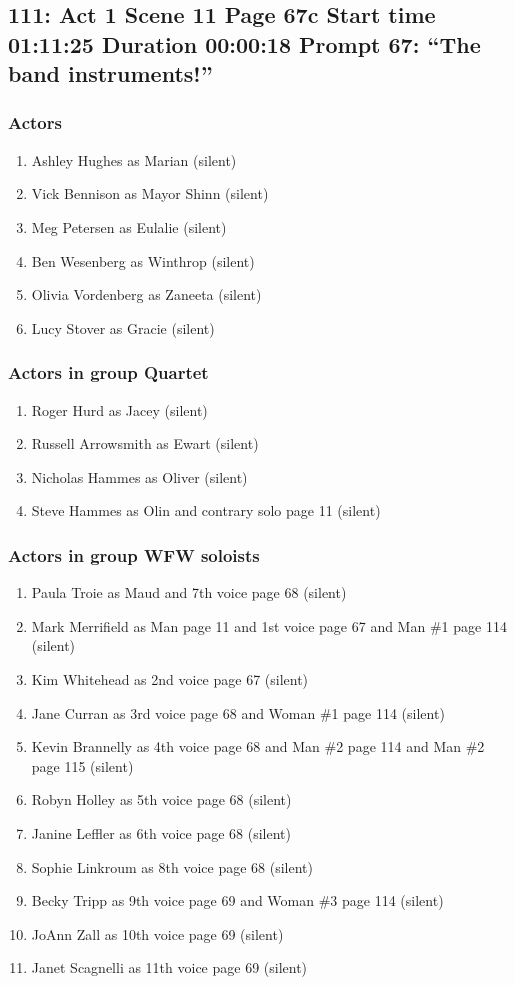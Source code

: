 \subsection{111: Act 1 Scene 11 Page 67c Start time 01:11:25 Duration 00:00:18 Prompt 67: ``The band instruments!''}

\subsubsection{Actors}
\begin{enumerate}
\item Ashley Hughes as Marian (silent)
\item Vick Bennison as Mayor Shinn (silent)
\item Meg Petersen as Eulalie (silent)
\item Ben Wesenberg as Winthrop (silent)
\item Olivia Vordenberg as Zaneeta (silent)
\item Lucy Stover as Gracie (silent)
\end{enumerate}
\subsubsection{Actors in group Quartet}
\begin{enumerate}
\item Roger Hurd as Jacey (silent)
\item Russell Arrowsmith as Ewart (silent)
\item Nicholas Hammes as Oliver (silent)
\item Steve Hammes as Olin and contrary solo page 11 (silent)
\end{enumerate}
\subsubsection{Actors in group WFW soloists}
\begin{enumerate}
\item Paula Troie as Maud and 7th voice page 68 (silent)
\item Mark Merrifield as Man page 11 and 1st voice page 67 and Man \#1 page 114 (silent)
\item Kim Whitehead as 2nd voice page 67 (silent)
\item Jane Curran as 3rd voice page 68 and Woman \#1 page 114 (silent)
\item Kevin Brannelly as 4th voice page 68 and Man \#2 page 114 and Man \#2 page 115 (silent)
\item Robyn Holley as 5th voice page 68 (silent)
\item Janine Leffler as 6th voice page 68 (silent)
\item Sophie Linkroum as 8th voice page 68 (silent)
\item Becky Tripp as 9th voice page 69 and Woman \#3 page 114 (silent)
\item JoAnn Zall as 10th voice page 69 (silent)
\item Janet Scagnelli as 11th voice page 69 (silent)
\end{enumerate}

